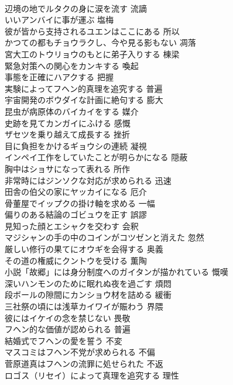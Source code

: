 \documentclass[8pt]{extreport}
\begin{document}
\begin{CJK}{UTF8}{min}
\\	辺境の地でルタクの身に涙を流す	流謫
\\	いいアンバイに事が運ぶ	塩梅
\\	彼が皆から支持されるユエンはここにある	所以
\\	かつての都もチョウラクし、今や見る影もない	凋落
\\	宮大工のトウリョウのもとに弟子入りする	棟梁
\\	緊急対策への関心をカンキする	喚起
\\	事態を正確にハアクする	把握
\\	実験によってフヘン的真理を追究する	普遍
\\	宇宙開発のボウダイな計画に絶句する	膨大
\\	昆虫が病原体のバイカイをする	媒介
\\	史跡を見てカンガイにふける	感慨
\\	ザセツを乗り越えて成長する	挫折
\\	目に負担をかけるギョウシの連続	凝視
\\	インペイ工作をしていたことが明らかになる	隠蔽
\\	胸中はショサになって表れる	所作
\\	非常時にはジンソクな対応が求められる	迅速
\\	田舎の伯父の家にヤッカイになる	厄介
\\	骨董屋でイップクの掛け軸を求める	一幅
\\	偏りのある結論のゴビュウを正す	誤謬
\\	見知った顔とエシャクを交わす	会釈
\\	マジシャンの手の中のコインがコツゼンと消えた	忽然
\\	厳しい修行の果てにオウギを会得する	奥義
\\	その道の権威にクントウを受ける	薫陶
\\	小説「故郷」には身分制度へのガイタンが描かれている	慨嘆
\\	深いハンモンのために眠れぬ夜を過ごす	煩悶
\\	段ボールの隙間にカンショウ材を詰める	緩衝
\\	三社祭の頃には浅草カイワイが賑わう	界隈
\\	彼にはイケイの念を禁じない	畏敬
\\	フヘン的な価値が認められる	普遍
\\	結婚式でフヘンの愛を誓う	不変
\\	マスコミはフヘン不党が求められる	不偏
\\	菅原道真はフヘンの流罪に処せられた	不返
\\	ロゴス（リセイ）によって真理を追究する	理性

\end{CJK}
\end{document}
